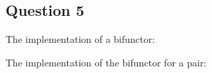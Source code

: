\subsection*{Question 5}

The implementation of a bifunctor:



The implementation of the bifunctor for a pair:

